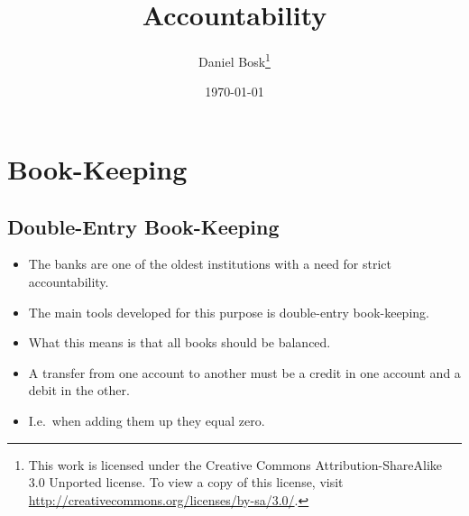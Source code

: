 \title{%
  Accountability
}
\author{Daniel Bosk\footnote{%
  This work is licensed under the Creative Commons Attribution-ShareAlike 3.0 
  Unported license.
	To view a copy of this license, visit 
	\url{http://creativecommons.org/licenses/by-sa/3.0/}.
}}
\date{\today}


\begin{frame}
  \titlepage{}
\end{frame}

\begin{frame}
  \tableofcontents
\end{frame}





\section{Book-Keeping}

\subsection{Double-Entry Book-Keeping}

\begin{frame}
  \begin{itemize}
    \item The banks are one of the oldest institutions with a need for strict 
      accountability.

    \item The main tools developed for this purpose is double-entry 
      book-keeping.

    \item What this means is that all books should be balanced.

    \item A transfer from one account to another must be a credit in one 
      account and a debit in the other.

    \item I.e.\ when adding them up they equal zero.
  \end{itemize}
\end{frame}

